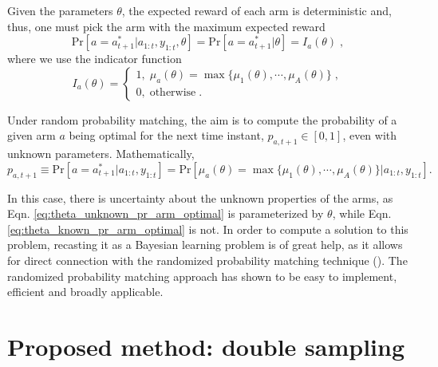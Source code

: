\documentclass{article}
\begin{document}
Given the parameters $\theta$, the expected reward of each arm is deterministic and, thus, one must pick the arm with the maximum expected reward
\begin{equation}
\mathrm{Pr}\left[a=a_{t+1}^*|a_{1:t}, y_{1:t}, \theta \right] = \mathrm{Pr}\left[a=a_{t+1}^*|\theta \right] = I_a(\theta) \;,
\end{equation}
where we use the indicator function
\begin{equation}
I_a(\theta) = \begin{cases}
1, \; \mu_{a}(\theta)=\max\{\mu_1(\theta), \cdots, \mu_A(\theta)\} \;, \\
0, \; \text{otherwise} \;.
\end{cases}
\label{eq:theta_known_pr_arm_optimal}
\end{equation}

Under random probability matching, the aim is to compute the probability of a given arm $a$ being optimal for the next time instant, $p_{a,t+1}\in [0,1]$, even with unknown parameters. Mathematically,
\begin{equation}
p_{a,t+1} \equiv \mathrm{Pr}\left[a=a_{t+1}^* \big| a_{1:t}, y_{1:t}\right]=\mathrm{Pr}\left[ \mu_{a}(\theta) = \max\{\mu_1(\theta), \cdots, \mu_A(\theta)\} \big| a_{1:t}, y_{1:t}\right].
\label{eq:theta_unknown_pr_arm_optimal}
\end{equation}

In this case, there is uncertainty about the unknown properties of the arms, as Eqn. \ref{eq:theta_unknown_pr_arm_optimal} is parameterized by $\theta$, while Eqn. \ref{eq:theta_known_pr_arm_optimal} is not. In order to compute a solution to this problem, recasting it as a Bayesian learning problem is of great help, as it allows for direct connection with the randomized probability matching technique (\cite{j-Scott2010}). The randomized probability matching approach has shown to be easy to implement, efficient and broadly applicable.

\section{Proposed method: double sampling}
\label{sec:proposed_method}
\end{document}
